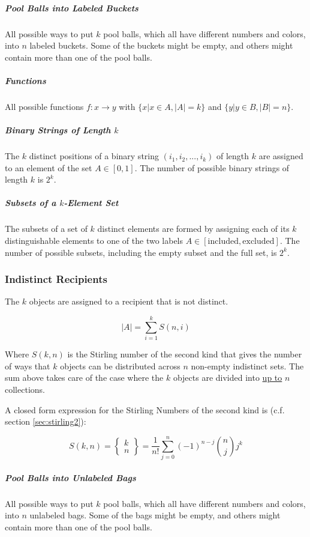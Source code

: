 \subparagraph{Pool Balls into Labeled Buckets} All possible ways to put $k$ pool balls, which all have different numbers and colors, into $n$ labeled buckets. Some of the buckets might be empty, and others might contain more than one of the pool balls.

\subparagraph{Functions} All possible functions $f:x \rightarrow y$ with $\{x | x\in A, |A| = k \}$ and $\{y | y\in B, |B| = n\}$.

\subparagraph{Binary Strings of Length $k$} The $k$ distinct positions of a binary string $(i_1,i_2,...,i_k)$ of length $k$ are assigned to an element of the set $A\in[0,1]$. The number of possible binary strings of length $k$ is $2^k$.

\subparagraph{Subsets of a $k$-Element Set} The subsets of a set of $k$ distinct elements are formed by assigning each of its $k$ distinguishable elements to one of the two labels $A\in [\mathrm{included},\mathrm{excluded}]$. The number of possible subsets, including the empty subset and the full set, is $2^k$.


\subsubsection{Indistinct Recipients}
The $k$ objects are assigned to a recipient that is not distinct. 

\begin{equation}
|A| = \sum_{i=1}^k S(n,i)
\end{equation}

Where $S(k,n)$ is the Stirling number of the second kind that gives the number of ways that $k$ objects can be distributed across $n$ non-empty indistinct sets. The sum above takes care of the case where the $k$ objects are divided into \underline{up to} $n$ collections.  

A closed form expression for the Stirling Numbers of the second kind is (c.f. section \ref{sec:stirling2}): 

\begin{equation}
S(k,n) = \left\{ \begin{array}{c} k \\n \end{array} \right\} = \frac{1}{n!}\sum_{j=0}^n (-1)^{n-j} {n \choose j }j^k
\label{eq:stirling2}
\end{equation}


\subparagraph{Pool Balls into Unlabeled Bags} All possible ways to put $k$ pool balls, which all have different numbers and colors, into $n$ unlabeled bags. Some of the bags might be empty, and others might contain more than one of the pool balls.


